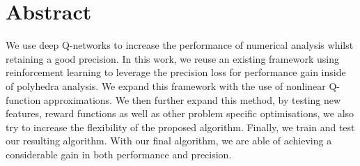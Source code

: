 
\chapter*{Abstract}
We use deep Q-networks to increase the performance of numerical analysis whilst retaining a good precision. In this work, we reuse an existing framework using reinforcement learning to leverage the precision loss for performance gain inside of polyhedra analysis. We expand this framework with the use of nonlinear Q-function approximations. We then further expand this method, by testing new features, reward functions as well as other problem specific optimisations, we also try to increase the flexibility of the proposed algorithm. Finally, we train and test our resulting algorithm. With our final algorithm, we are able of achieving a considerable gain in both performance and precision.

